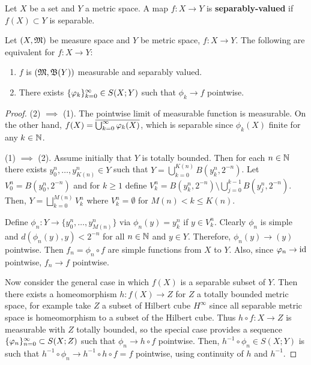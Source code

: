 \documentclass[a4paper]{article}
\begin{document}
\begin{defi}
Let $X$ be a set and $Y$ a metric space. A map $f: X
\to Y$ is \textbf{separably-valued}
if $f(X) \subset Y$ is separable.
\end{defi}

\begin{thm}
  Let $(X, \mathfrak{M})$ be measure space and $Y$ be metric space,
  $f : X \to Y$. The following are equivalent for
  $f: X \to Y$:
  \begin{enumerate}
    \item $f$ is $(\mathfrak{M}, \mathfrak{B}(Y))$ measurable and
    separably valued.
    \item There exists $\{ \varphi_k \}_{k=0}^\infty \in S(X; Y)$
    such that $\phi_k \to f$ pointwise.
  \end{enumerate}
\end{thm}

\begin{proof}

(2) $\implies$ (1). The pointwise limit of measurable function
is measurable. On the other hand, $f(X) = \overline{\bigcup_{k=0}^\infty \varphi_k(X)}$,
which is separable since $\phi_k(X)$ finite for any $k \in \mathbb{N}$.

(1) $\implies$ (2). Assume initially that $Y$ is totally bounded.
Then for each $n \in \mathbb{N}$ there exists $y^n_0, \dots, y^n_{K(n)} \in Y$
such that $Y = \bigcup_{k=0}^{K(n)} B(y^n_k, 2^{-n})$.
Let $V^n_0 = B(y_0^n, 2^{-n})$ and for $k \geq 1$ define
$V^n_k = B(y^n_k, 2^{-n}) \setminus \bigcup_{j=0}^{k-1}
B(y^n_j, 2^{-n})$. Then, $Y = \bigsqcup_{k=0}^{M(n)} V_k^n$
where $V^n_k = \emptyset$ for $M(n) < k \leq K(n)$.

Define $\phi_n: Y \to \{ y_0^n, \dots, y_{M(n)}^n \}$
via $\phi_n(y) = y_k^n$ if $y \in V_k^n$. Clearly $\phi_n$
is simple and $d(\phi_n(y), y) < 2^{-n}$ for all $n \in \mathbb{N}$
and $y \in Y$. Therefore, $\phi_n(y) \to (y)$ pointwise.
Then $f_n = \phi_n \circ f$ are simple functions
from $X$ to $Y$. Also, since $\varphi_n \to \operatorname{id}$ pointwise,
$f_n \to f$ pointwise.

Now consider the general case in which $f(X)$ is a separable
subset of $Y$. Then there exists a homeomorphism $h: f(X)
\to Z$ for $Z$ a totally bounded metric space, for example
take $Z$ a subset of Hilbert cube $H^\infty$ since
all separable metric space is homeomorphism to a subset of
the Hilbert cube. Thus $h \circ f: X \to Z$ is measurable
with $Z$ totally bounded, so the special case provides
a sequence $\{ \varphi_n \}_{n=0}^\infty \subset S(X; Z)$ such that
$\phi_n \to h \circ f$ pointwise. Then,
$h^{-1} \circ \phi_n \in S(X; Y)$ is such that
$h^{-1} \circ \phi_n \to h^{-1} \circ h \circ f = f$
pointwise, using continuity of $h$ and $h^{-1}$.

\end{proof}
\end{document}
